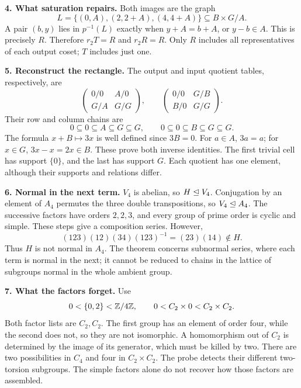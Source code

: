 \clearpage
\textbf{4. What saturation repairs.}
Both images are the graph
\[
 L=\{(0,A),(2,2+A),(4,4+A)\}\subseteq B\times G/A.
\]
A pair \((b,y)\) lies in \(p^{-1}(L)\) exactly when \(y+A=b+A\),
or \(y-b\in A\). This is precisely \(R\). Therefore
\(r_2T=R\) and \(r_2R=R\). Only \(R\) includes all representatives
of each output coset; \(T\) includes just one.

\medskip
\textbf{5. Reconstruct the rectangle.}
The output and input quotient tables, respectively, are
\[
 \begin{pmatrix}0/0&A/0\\G/A&G/G\end{pmatrix},
 \qquad
 \begin{pmatrix}0/0&G/B\\B/0&G/G\end{pmatrix}.
\]
Their row and column chains are
\[
 0\subseteq0\subseteq A\subseteq G\subseteq G,\qquad
 0\subseteq0\subseteq B\subseteq G\subseteq G.
\]
The formula \(x+B\mapsto3x\) is well defined since \(3B=0\).
For \(a\in A\), \(3a=a\); for \(x\in G\), \(3x-x=2x\in B\).
These prove both inverse identities. The first trivial cell has support
\(\{0\}\), and the last has support \(G\). Each quotient has one element,
although their supports and relations differ.

\medskip
\textbf{6. Normal in the next term.}
\(V_4\) is abelian, so \(H\trianglelefteq V_4\). Conjugation by an element of
\(A_4\) permutes the three double transpositions, so \(V_4\trianglelefteq A_4\).
The successive factors have orders \(2,2,3\), and every group of prime
order is cyclic and simple. These steps give a composition series.
However,
\[
 (123)(12)(34)(123)^{-1}=(23)(14)\notin H.
\]
Thus \(H\) is not normal in \(A_4\). The theorem concerns subnormal
series, where each term is normal in the next; it cannot be reduced to
chains in the lattice of subgroups normal in the whole ambient group.

\medskip
\textbf{7. What the factors forget.}
Use
\[
 0<\{0,2\}<\mathbb Z/4\mathbb Z,\qquad
 0<C_2\times0<C_2\times C_2.
\]
Both factor lists are \(C_2,C_2\). The first group has an element of order
four, while the second does not, so they are not isomorphic.
A homomorphism out of \(C_2\) is determined by the image of its generator,
which must be killed by two. There are two possibilities in \(C_4\)
and four in \(C_2\times C_2\). The probe detects their different
two-torsion subgroups. The simple factors alone do not recover how those
factors are assembled.
